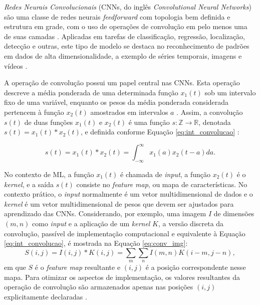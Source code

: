 \emph{Redes Neurais Convolucionais} (CNNs, do inglês \emph{Convolutional Neural Networks}) são uma classe de redes neurais \emph{feedforward} com topologia bem definida e estrutura em grade, com o uso de operações de convolução em pelo menos uma de suas camadas \cite{goodfellow2016deep}. Aplicadas em tarefas de classificação, regressão, localização, detecção e outras, este tipo de modelo se destaca no reconhecimento de padrões em dados de alta dimensionalidade, a exemplo de séries temporais, imagens e vídeos \cite{Khan:Livro}.

A operação de convolução possui um papel central nas CNNs. Esta operação descreve a média ponderada de uma determinada função $x_1(t)$ sob um intervalo fixo de uma variável, enquanto os pesos da média ponderada considerada pertencem à função $x_2(t)$ amostrados em intervalos $a$ \cite{bracewell1986fourier}. Assim, a convolução $s(t)$ de duas funções $x_1(t)$ e $x_2(t)$ é uma função $s: \mathds{Z} \rightarrow \mathds{R}$, denotada $s(t) = x_1(t) * x_2(t)$, e definida conforme Equação \ref{eq:int_convolucao} \cite{lathi2006sinais}:

\begin{equation}\label{eq:int_convolucao}
s(t) = x_1(t) * x_2(t) = \int_{-\infty}^{\infty} x_1(a) x_2(t-a)da.
\end{equation}

No contexto de ML, a função $x_1(t)$ é chamada de \emph{input}, a função $x_2(t)$ é o \emph{kernel}, e a saída $s(t)$ consiste no \emph{feature map}, ou mapa de características. No contexto prático, o \emph{input} normalmente é um vetor multidimensional de dados e o \emph{kernel} é um vetor multidimensional de pesos que devem ser ajustados para aprendizado das CNNs. Considerando, por exemplo, uma imagem $I$ de dimensões $(m,n)$ como \emph{input} e a aplicação de um \emph{kernel} $K$, a versão discreta da convolução, passível de implementação computacional e equivalente à Equação \ref{eq:int_convolucao}, é mostrada na Equação \ref{eq:conv_img}:
\begin{equation}
 S(i,j) = I(i,j)*K(i,j) = \sum_{m}\sum_{n}I(m,n)K(i-m,j-n),\label{eq:conv_img}
\end{equation}
em que $S$ é o \emph{feature map} resultante e $(i,j)$ é a posição correspondente nesse mapa. Para otimizar os aspectos de implementação, os valores resultantes da operação de convolução são armazenados apenas nas posições $(i,j)$ explicitamente declaradas \cite{goodfellow2016deep}.

